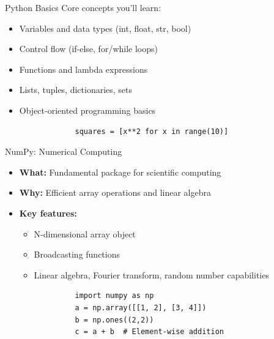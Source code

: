 \documentclass{beamer}
\begin{document}
	\begin{frame}{Python Basics}
		Core concepts you'll learn:
		\begin{itemize}
			\item Variables and data types (int, float, str, bool)
			\item Control flow (if-else, for/while loops)
			\item Functions and lambda expressions
			\item Lists, tuples, dictionaries, sets
			\item Object-oriented programming basics
		\end{itemize}
		
		\begin{example}
			\begin{lstlisting}
				squares = [x**2 for x in range(10)]
			\end{lstlisting}
		\end{example}
	\end{frame}
	
	\begin{frame}{NumPy: Numerical Computing}
		\begin{itemize}
			\item \textbf{What:} Fundamental package for scientific computing
			\item \textbf{Why:} Efficient array operations and linear algebra
			\item \textbf{Key features:}
			\begin{itemize}
				\item N-dimensional array object
				\item Broadcasting functions
				\item Linear algebra, Fourier transform, random number capabilities
			\end{itemize}
		\end{itemize}
		
		\begin{example}
			\begin{lstlisting}
				import numpy as np
				a = np.array([[1, 2], [3, 4]])
				b = np.ones((2,2))
				c = a + b  # Element-wise addition
			\end{lstlisting}
		\end{example}
	\end{frame}
	
\end{document}
